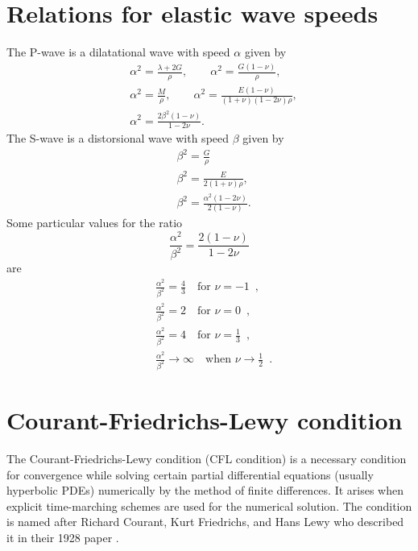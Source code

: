 \documentclass[12pt,letterpaper,landscape]{article}
\begin{document}
\section{Relations for elastic wave speeds}

The P-wave is a dilatational wave with speed $\alpha$ given by 
\begin{align*}
 & \alpha^{2}=\frac{\lambda+2G}{\rho},\qquad\alpha^{2}=\frac{G(1-\nu)}{\rho},\\
 & \alpha^{2}=\frac{M}{\rho},\qquad\alpha^{2}=\frac{E(1-\nu)}{(1+\nu)(1-2\nu)\rho},\\
 & \alpha^{2}=\frac{2\beta^{2}(1-\nu)}{1-2\nu}.
\end{align*}
 The S-wave is a distorsional wave with speed $\beta$ given by 
\begin{align*}
 & \beta^{2}=\frac{G}{\rho}\\
 & \beta^{2}=\frac{E}{2(1+\nu)\rho},\\
 & \beta^{2}=\frac{\alpha^{2}(1-2\nu)}{2(1-\nu)}.
\end{align*}
 Some particular values for the ratio 
\[
\frac{\alpha^{2}}{\beta^{2}}=\frac{2(1-\nu)}{1-2\nu}
\]
 are 
\begin{align*}
 & \frac{\alpha^{2}}{\beta^{2}}=\frac{4}{3}\quad\mbox{for }\nu=-1\enspace,\\
 & \frac{\alpha^{2}}{\beta^{2}}=2\quad\mbox{for }\nu=0\enspace,\\
 & \frac{\alpha^{2}}{\beta^{2}}=4\quad\mbox{for }\nu=\frac{1}{3}\enspace,\\
 & \frac{\alpha^{2}}{\beta^{2}}\rightarrow\infty\quad\mbox{when }\nu\rightarrow\frac{1}{2}\enspace.
\end{align*}



\section{Courant-Friedrichs-Lewy condition}

The Courant-Friedrichs-Lewy condition (CFL condition) is a necessary
condition for convergence while solving certain partial differential
equations (usually hyperbolic PDEs) numerically by the method of finite
differences. It arises when explicit time-marching schemes are used
for the numerical solution. The condition is named after Richard Courant,
Kurt Friedrichs, and Hans Lewy who described it in their 1928 paper
\cite{CFL}.
\end{document}
